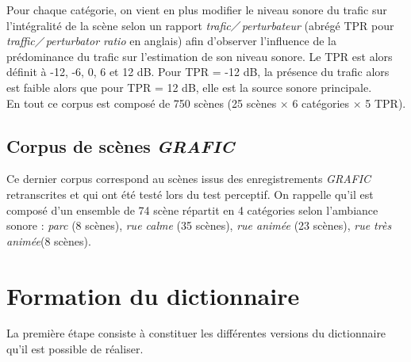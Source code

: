 Pour chaque catégorie, on vient en plus modifier le niveau sonore du trafic sur l'intégralité de la scène selon un rapport \og \textit{trafic}$\diagup$\textit{perturbateur}\fg{} (abrégé TPR pour \textit{traffic}$\diagup$\textit{perturbator ratio} en anglais) afin d'observer l'influence de la prédominance du trafic sur l'estimation de son niveau sonore. Le TPR est alors définit à -12, -6, 0, 6 et 12 dB. Pour TPR = -12 dB, la présence du trafic alors est faible alors que pour TPR = 12 dB, elle est la source sonore principale.\\

En tout ce corpus est composé de 750 scènes (25 scènes $\times$ 6 catégories $\times$ 5 TPR).

\subsection{Corpus de scènes \textit{GRAFIC}} 

Ce dernier corpus correspond au scènes issus des enregistrements \textit{GRAFIC} retranscrites et qui ont été testé lors du test perceptif. On rappelle qu'il est composé d'un ensemble de 74 scène répartit en 4 catégories selon l'ambiance sonore : \textit{parc} (8 scènes), \textit{rue calme} (35 scènes), \textit{rue animée} (23 scènes), \textit{rue très animée}(8 scènes). 

\section{Formation du dictionnaire}
La première étape consiste à constituer les différentes versions du dictionnaire qu'il est possible de réaliser. 

